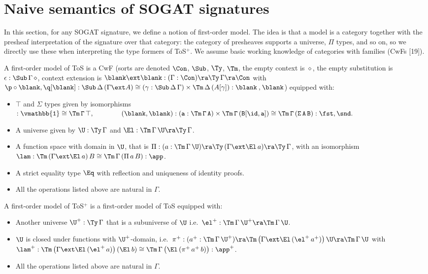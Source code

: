 \section{Naive semantics of SOGAT signatures}
\label{sec:naive}

In this section, for any SOGAT signature, we define a notion of
first-order model. The idea is that a model is a category together
with the presheaf interpretation of the signature over that category:
the category of presheaves supports a universe, $\Pi$ types, and so
on, so we directly use these when interpreting the type formers of ToS$^+$.
We assume basic working knowledge of
categories with families (CwFs
[19]).
\begin{definition}\label{def:gat_gat}
  A first-order model of ToS is a CwF (sorts
  are denoted $\Con$, $\Sub$, $\Ty$, $\Tm$, the empty context is $\diamond$, the empty substitution is $\epsilon:\Sub\,\Gamma\,\diamond$, context extension is
  $\blank\ext\blank : (\Gamma:\Con)\ra\Ty\,\Gamma\ra\Con$ with $\p\circ\blank,\q[\blank] :
  \Sub\,\Delta\,(\Gamma\ext A) \cong
  (\gamma:\Sub\,\Delta\,\Gamma)\times\Tm\,\Delta\,(A[\gamma]) :
  \blank\mathbin{{,}}\blank$) equipped with:
  \begin{itemize}
  \item $\top$ and $\Sigma$ types given by isomorphisms \\
    $
    \tt : \vmathbb{1} \cong \Tm\,\Gamma\,\top, \hspace{4em} (\blank,\blank) : (a:\Tm\,\Gamma\,A)\times\Tm\,\Gamma\,(B[\id,a]) \cong \Tm\,\Gamma\,(\Sigma\,A\,B) : \fst,\snd.
    $
  \item A universe given by $\U : \Ty\,\Gamma$ and $\El : \Tm\,\Gamma\,\U\ra\Ty\,\Gamma$.
  \item A function space with domain in $\U$, that is
    $\Pi:(a:\Tm\,\Gamma\,\U)\ra\Ty\,(\Gamma\ext\El\,a)\ra\Ty\,\Gamma$,
    with an isomorphism $\lam : \Tm\,(\Gamma\ext\El\,a)\,B \cong 
    \Tm\,\Gamma\,(\Pi\,a\,B) : \app$.
  \item A strict equality type $\Eq$ with reflection and uniqueness of
    identity proofs.
  \item All the operations listed above are natural in $\Gamma$.
  \end{itemize}
\end{definition}
\begin{definition}\label{def:sogat_gat}
  A first-order model of ToS$^+$ is a
  first-order model of ToS equipped with:
  \begin{itemize}
  \item Another universe $\U^+ : \Ty\,\Gamma$ that is a subuniverse of
    $\U$ i.e.\ $\el^+:\Tm\,\Gamma\,\U^+\ra\Tm\,\Gamma\,\U$.
  \item $\U$ is closed under functions with $\U^+$-domain, i.e.\ 
    $\pi^+ :
    (a^+:\Tm\,\Gamma\,\U^+)\ra\Tm\,\big(\Gamma\ext\El\,(\el^+\,a^+)\big)\,\U\ra\Tm\,\Gamma\,\U$
    with $\lam^+ :
    \Tm\,\big(\Gamma\ext\El\,(\el^+\,a)\big)\,(\El\,b) \cong 
    \Tm\,\Gamma\,\big(\El\,(\pi^+\,a^+\,b)\big) : \app^+$.
  \item All the operations listed above are natural in $\Gamma$.
  \end{itemize}
\end{definition}
